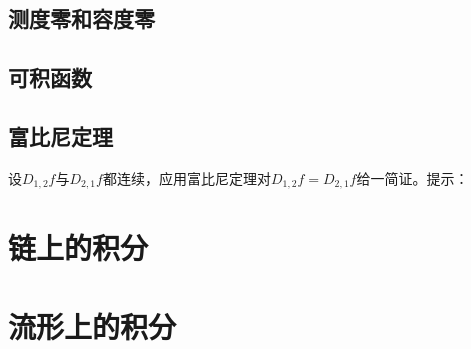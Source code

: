 \section{测度零和容度零}\label{section0090302}


\section{可积函数}\label{section0090303}


\section{富比尼定理}\label{section0090304}

\begin{problemset}
\item\label{exer009030328} 设$D_{1,2}f$与$D_{2,1}f$都连续，应用富比尼定理对$D_{1,2}f = D_{2,1}f$给一简证。提示：

\end{problemset}



\chapter{链上的积分}\label{chapter00904}




\chapter{流形上的积分}\label{chapter00905}

